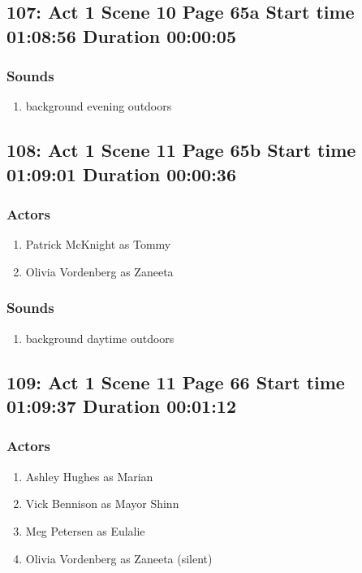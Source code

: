 \subsection{107: Act 1 Scene 10 Page 65a Start time 01:08:56 Duration 00:00:05}
\subsubsection{Sounds}
\begin{enumerate}
\item background evening outdoors
\end{enumerate}
\subsection{108: Act 1 Scene 11 Page 65b Start time 01:09:01 Duration 00:00:36}

\subsubsection{Actors}
\begin{enumerate}
\item Patrick McKnight as Tommy
\item Olivia Vordenberg as Zaneeta
\end{enumerate}

\subsubsection{Sounds}
\begin{enumerate}
\item background daytime outdoors
\end{enumerate}
\subsection{109: Act 1 Scene 11 Page 66 Start time 01:09:37 Duration 00:01:12}

\subsubsection{Actors}
\begin{enumerate}
\item Ashley Hughes as Marian
\item Vick Bennison as Mayor Shinn
\item Meg Petersen as Eulalie
\item Olivia Vordenberg as Zaneeta (silent)
\end{enumerate}

